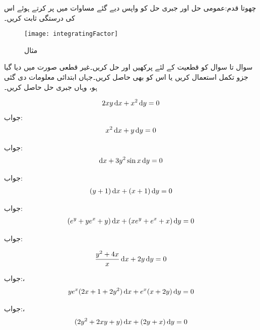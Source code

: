 چھوتا قدم:عمومی حل اور جبری حل کو واپس دیے گئے مساوات میں پر کرتے ہوئے اس کی درستگی ثابت کریں۔
\begin{figure}
\centering
\texttt{[image: integratingFactor]}
\caption{مثال }
\label{شکل_مثال_سادہ_اول_جزو_تکمل_حصول}
\end{figure}

سوال  تا سوال  کو قطعیت کے لئے پرکھیں اور حل کریں۔غیر قطعی صورت میں دیا گیا جزو تکمل استعمال کریں یا اس کو بھی حاصل کریں۔جہاں ابتدائی معلومات دی گئی ہو، وہاں جبری حل حاصل کریں۔

\begin{align*}
2xy \dif x+x^2\dif y=0
\end{align*}
جواب:
\begin{align*}
x^2\dif x+y\dif y=0
\end{align*}

جواب:
\begin{align*}
[\sin x+(x+y^3)\cos x]\dif x+3y^2\sin x \dif y=0
\end{align*}

جواب:
\begin{align*}
(y+1)\dif x+(x+1)\dif y=0
\end{align*}

جواب:
\begin{align*}
(e^y+ye^x+y)\dif x+(xe^y+e^x+x)\dif y=0
\end{align*}

جواب:

\begin{align*}
\frac{y^2+4x}{x}\dif x+2y\dif y=0
\end{align*}

جواب:، 
\begin{align*}
ye^x(2x+1+2y^2)\dif x+e^x(x+2y)\dif y=0
\end{align*}

جواب:، 
\begin{align*}
(2y^2+2xy+y)\dif x+(2y+x)\dif y=0
\end{align*}

